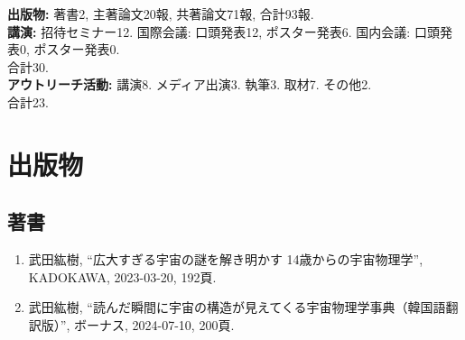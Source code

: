 \documentclass[uplatex, 11pt]{jsarticle}
\begin{document}
\noindent
\textbf{出版物:}  著書2, 主著論文20報, 共著論文71報, 合計93報.\\

\noindent 
\textbf{講演:} 招待セミナー12. 国際会議: 口頭発表12, ポスター発表6. 国内会議: 口頭発表0, ポスター発表0.\\
\hspace{0.8cm}合計30. \\

\noindent 
\textbf{アウトリーチ活動:} 講演8. メディア出演3. 執筆3. 取材7. その他2.\\
\hspace{2.75cm}合計23. \\


\section*{出版物}
\subsection*{著書}
\begin{enumerate}
\item 武田紘樹, “広大すぎる宇宙の謎を解き明かす 14歳からの宇宙物理学”, KADOKAWA, 2023-03-20, 192頁.
\item 武田紘樹, “読んだ瞬間に宇宙の構造が見えてくる宇宙物理学事典（韓国語翻訳版）”, ボーナス, 2024-07-10, 200頁.
\end{enumerate}
\end{document}
